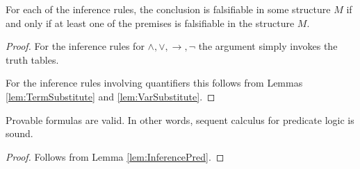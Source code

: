 \begin{page}
\setcounter{section}{2}
\setcounter{subsection}{2}
\setcounter{dfn}{5}
\label{portion:551}

\begin{lem}
\label{lem:InferencePred}
For each of the inference rules, the conclusion is falsifiable in some structure $M$
if and only if at least one of the premises is falsifiable in the structure $M$.
\end{lem}

\end{page}

\begin{page}
\setcounter{section}{2}
\setcounter{subsection}{2}
\setcounter{dfn}{5}
\label{portion:552}

\begin{proof}
For the inference rules for $\wedge, \vee, \to, \neg$ the argument simply invokes the truth tables.

For the inference rules involving quantifiers this follows from Lemmas \ref{lem:TermSubstitute} and \ref{lem:VarSubstitute}.
\end{proof}


\end{page}

\begin{page}
\setcounter{section}{2}
\setcounter{subsection}{2}
\setcounter{dfn}{6}
\label{portion:554}

\begin{thm}
Provable formulas are valid.
In other words, sequent calculus for predicate logic is sound.
\end{thm}

\end{page}

\begin{page}
\setcounter{section}{2}
\setcounter{subsection}{2}
\setcounter{dfn}{6}
\label{portion:555}

\begin{proof}
Follows from Lemma \ref{lem:InferencePred}.
\end{proof}



\end{page}

